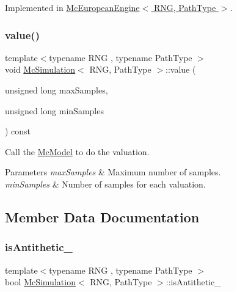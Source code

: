 Implemented in \hyperlink{class_mc_european_engine_ae4e0ab6834416144221f1a91dd154587}{Mc\+European\+Engine$<$ R\+N\+G, Path\+Type $>$}.

\hypertarget{class_mc_simulation_a0e5d11df4cca5b1f3dcdc8f528a9a56f}{}\label{class_mc_simulation_a0e5d11df4cca5b1f3dcdc8f528a9a56f} 
\subsubsection{\texorpdfstring{value()}{value()}}
{\footnotesize\ttfamily template$<$typename R\+NG , typename Path\+Type $>$ \\
void \hyperlink{class_mc_simulation}{Mc\+Simulation}$<$ R\+NG, Path\+Type $>$\+::value (\begin{DoxyParamCaption}\item[{unsigned long}]{max\+Samples,  }\item[{unsigned long}]{min\+Samples }\end{DoxyParamCaption}) const\hspace{0.3cm}{\ttfamily [private]}}



Call the \hyperlink{class_mc_model}{Mc\+Model} to do the valuation. 


\begin{DoxyParams}{Parameters}
{\em max\+Samples} & Maximum number of samples. \\
\hline
{\em min\+Samples} & Number of samples for each valuation. \\
\hline
\end{DoxyParams}


\subsection{Member Data Documentation}
\hypertarget{class_mc_simulation_af17f26f85e3f48406229d7b6f84b3f89}{}\label{class_mc_simulation_af17f26f85e3f48406229d7b6f84b3f89} 
\subsubsection{\texorpdfstring{is\+Antithetic\+\_\+}{isAntithetic\_}}
{\footnotesize\ttfamily template$<$typename R\+NG , typename Path\+Type $>$ \\
bool \hyperlink{class_mc_simulation}{Mc\+Simulation}$<$ R\+NG, Path\+Type $>$\+::is\+Antithetic\+\_\+\hspace{0.3cm}{\ttfamily [private]}}



